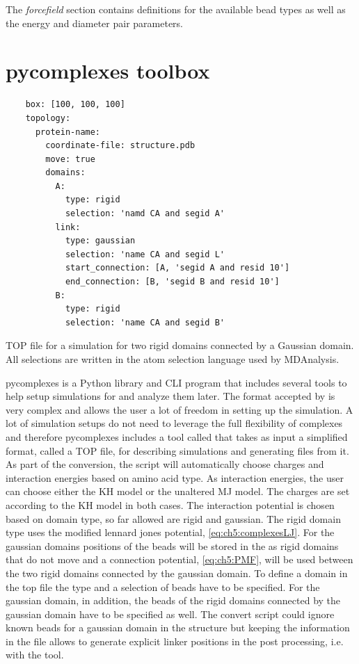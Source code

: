 \documentclass[12pt, twoside]{report}
\begin{document}
The \textit{forcefield} section contains definitions for the available bead
types as well as the energy and diameter pair parameters.

\chapter{pycomplexes toolbox}
\begin{listing}[!ht]
  \begin{verbatim}
    box: [100, 100, 100]
    topology:
      protein-name:
        coordinate-file: structure.pdb
        move: true
        domains:
          A:
            type: rigid
            selection: 'namd CA and segid A'
          link:
            type: gaussian
            selection: 'name CA and segid L'
            start_connection: [A, 'segid A and resid 10']
            end_connection: [B, 'segid B and resid 10']
          B:
            type: rigid
            selection: 'name CA and segid B'
\end{verbatim}
\caption{TOP file for a simulation for two rigid domains connected by a Gaussian
domain. All selections are written in the atom selection language used by
MDAnalysis.}
\label{listing:top-definitions}
\end{listing} pycomplexes is a \mbox{Python} library and \gls{CLI} program that
includes several tools to help setup simulations for \complexes and analyze them
later. The \cplx format accepted by \complexes is very complex and allows the
user a lot of freedom in setting up the simulation. A lot of simulation setups
do not need to leverage the full flexibility of complexes and therefore
pycomplexes includes a tool called  that takes as input a
simplified format, called a TOP file, for describing simulations and generating
\cplx files from it. As part of the conversion, the script will automatically
choose charges and interaction energies based on amino acid type. As interaction
energies, the user can choose either the \gls{KH} model or the unaltered
\gls{MJ} model. The charges are set according to the \gls{KH} model in both
cases. The interaction potential is chosen based on domain type, so far allowed
are rigid and gaussian. The rigid domain type uses the modified lennard jones
potential, \cref{eq:ch5:complexesLJ}. For the gaussian domains positions of the
\calpha beads will be stored in the \cplx as rigid domains that do not move and
a connection potential, \cref{eq:ch5:PMF}, will be used between the two rigid
domains connected by the gaussian domain. To define a domain in the top file the
type and a selection of beads have to be specified. For the gaussian domain, in
addition, the beads of the rigid domains connected by the gaussian domain have
to be specified as well. The convert script could ignore known beads for a
gaussian domain in the structure but keeping the information in the \cplx file
allows to generate explicit linker positions in the post processing, i.e. with
the  tool.
\end{document}
